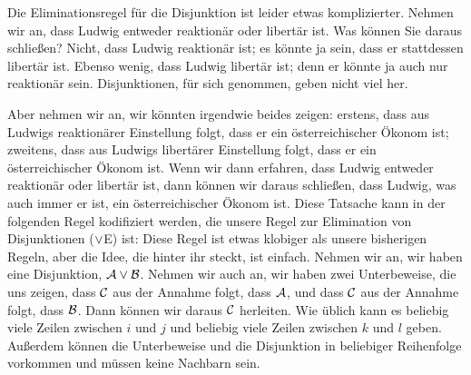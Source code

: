 Die Eliminationsregel für die Disjunktion ist leider etwas komplizierter. Nehmen wir an, dass Ludwig entweder reaktionär oder libertär ist. Was können Sie daraus schlie{\ss}en? Nicht, dass Ludwig reaktionär ist; es könnte ja sein, dass er stattdessen libertär ist. Ebenso wenig, dass Ludwig libertär ist; denn er könnte ja auch nur reaktionär sein. Disjunktionen, für sich genommen, geben nicht viel her. 

Aber nehmen wir an, wir könnten irgendwie beides zeigen: erstens, dass aus Ludwigs reaktionärer Einstellung folgt, dass er ein österreichischer Ökonom ist; zweitens, dass aus Ludwigs libertärer Einstellung folgt, dass er ein österreichischer Ökonom ist. Wenn wir dann erfahren, dass Ludwig entweder reaktionär oder libertär ist, dann können wir daraus schlie{\ss}en, dass Ludwig, was auch immer er ist, ein österreichischer Ökonom ist. Diese Tatsache kann in der folgenden Regel kodifiziert werden, die unsere Regel zur Elimination von Disjunktionen ($\vee$E) ist:
Diese Regel ist etwas klobiger als unsere bisherigen Regeln, aber die Idee, die hinter ihr steckt, ist einfach. Nehmen wir an, wir haben eine Disjunktion, $\mathcal{A} \vee \mathcal{B}$. Nehmen wir auch an, wir haben zwei Unterbeweise, die uns zeigen, dass $\mathcal{C}$ aus der Annahme folgt, dass $\mathcal{A}$, und dass $\mathcal{C}$ aus der Annahme folgt, dass $\mathcal{B}$. Dann können wir daraus $\mathcal{C}$ herleiten. Wie üblich kann es beliebig viele Zeilen zwischen $i$ und $j$ und beliebig viele Zeilen zwischen $k$ und $l$ geben. Au{\ss}erdem können die Unterbeweise und die Disjunktion in beliebiger Reihenfolge vorkommen und müssen keine Nachbarn sein.

